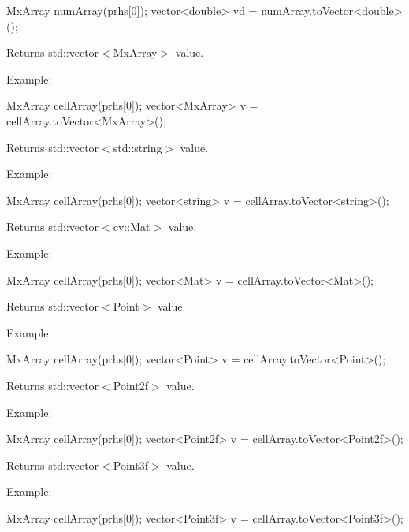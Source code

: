 \begin{DoxyCode}
 MxArray numArray(prhs[0]);
 vector<double> vd = numArray.toVector<double>();
\end{DoxyCode}


\begin{DoxyReturn}{\-Returns}
std\-::vector$<$\-Mx\-Array$>$ value.
\end{DoxyReturn}
\-Example\-: 
\begin{DoxyCode}
 MxArray cellArray(prhs[0]);
 vector<MxArray> v = cellArray.toVector<MxArray>();
\end{DoxyCode}


\begin{DoxyReturn}{\-Returns}
std\-::vector$<$std\-::string$>$ value.
\end{DoxyReturn}
\-Example\-: 
\begin{DoxyCode}
 MxArray cellArray(prhs[0]);
 vector<string> v = cellArray.toVector<string>();
\end{DoxyCode}


\begin{DoxyReturn}{\-Returns}
std\-::vector$<$cv\-::\-Mat$>$ value.
\end{DoxyReturn}
\-Example\-: 
\begin{DoxyCode}
 MxArray cellArray(prhs[0]);
 vector<Mat> v = cellArray.toVector<Mat>();
\end{DoxyCode}


\begin{DoxyReturn}{\-Returns}
std\-::vector$<$\-Point$>$ value.
\end{DoxyReturn}
\-Example\-: 
\begin{DoxyCode}
 MxArray cellArray(prhs[0]);
 vector<Point> v = cellArray.toVector<Point>();
\end{DoxyCode}


\begin{DoxyReturn}{\-Returns}
std\-::vector$<$\-Point2f$>$ value.
\end{DoxyReturn}
\-Example\-: 
\begin{DoxyCode}
 MxArray cellArray(prhs[0]);
 vector<Point2f> v = cellArray.toVector<Point2f>();
\end{DoxyCode}


\begin{DoxyReturn}{\-Returns}
std\-::vector$<$\-Point3f$>$ value.
\end{DoxyReturn}
\-Example\-: 
\begin{DoxyCode}
 MxArray cellArray(prhs[0]);
 vector<Point3f> v = cellArray.toVector<Point3f>();
\end{DoxyCode}



